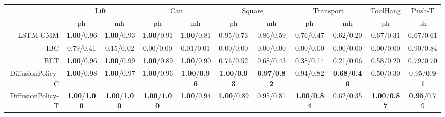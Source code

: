

































\setlength\tabcolsep{ 3 pt}
\begin{tabular}{r|cc|cc|cc|cc|c|c}
\toprule
 & \multicolumn{2}{c|}{Lift} & \multicolumn{2}{c|}{Can} & \multicolumn{2}{c|}{Square} & \multicolumn{2}{c|}{Transport} & \multicolumn{1}{c|}{ToolHang} & \multicolumn{1}{c}{Push-T} \\
 & ph & mh & ph & mh & ph & mh & ph & mh & ph & ph \\
\midrule
LSTM-GMM & \small \textbf{1.00}/0.96 & \small \textbf{1.00}/0.93 & \small \textbf{1.00}/0.91 & \small \textbf{1.00}/0.81 & \small 0.95/0.73 & \small 0.86/0.59 & \small 0.76/0.47 & \small 0.62/0.20 & \small 0.67/0.31 & \small 0.67/0.61 \\
IBC & \small 0.79/0.41 & \small 0.15/0.02 & \small 0.00/0.00 & \small 0.01/0.01 & \small 0.00/0.00 & \small 0.00/0.00 & \small 0.00/0.00 & \small 0.00/0.00 & \small 0.00/0.00 & \small 0.90/0.84 \\
BET & \small \textbf{1.00}/0.96 & \small \textbf{1.00}/0.99 & \small \textbf{1.00}/0.89 & \small \textbf{1.00}/0.90 & \small 0.76/0.52 & \small 0.68/0.43 & \small 0.38/0.14 & \small 0.21/0.06 & \small 0.58/0.20 & \small 0.79/0.70 \\
\midrule
DiffusionPolicy-C & \small \textbf{1.00}/0.98 & \small \textbf{1.00}/0.97 & \small \textbf{1.00}/0.96 & \small \textbf{1.00}/\textbf{0.96} & \small \textbf{1.00}/\textbf{0.93} & \small \textbf{0.97}/\textbf{0.82} & \small 0.94/0.82 & \small \textbf{0.68}/\textbf{0.46} & \small 0.50/0.30 & \small 0.95/\textbf{0.91} \\
DiffusionPolicy-T & \small \textbf{1.00}/\textbf{1.00} & \small \textbf{1.00}/\textbf{1.00} & \small \textbf{1.00}/\textbf{1.00} & \small \textbf{1.00}/0.94 & \small \textbf{1.00}/0.89 & \small 0.95/0.81 & \small \textbf{1.00}/\textbf{0.84} & \small 0.62/0.35 & \small \textbf{1.00}/\textbf{0.87} & \small \textbf{0.95}/0.79 \\
\bottomrule
\end{tabular}















